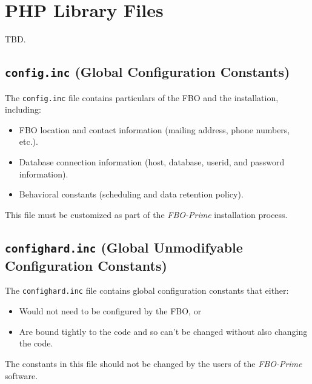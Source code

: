\documentclass[letterpaper,10pt,titlepage]{article}
\newcommand{\productbasename}{FBO-Prime}
\begin{document}
\section{PHP Library Files}
\label{sphl0}

TBD.


\subsection{\texttt{config.inc} (Global Configuration Constants)}
\label{sphl0:siph0}

The \texttt{config.inc} file contains particulars
of the FBO and the installation, including:

\begin{itemize}
\item FBO location and contact information (mailing address, phone numbers, etc.).
\item Database connection information (host, database, userid, and password information).
\item Behavioral constants (scheduling and data retention policy).
\end{itemize}

This file must be customized as part of the
\emph{\productbasename{}} installation process.


\subsection{\texttt{confighard.inc} (Global Unmodifyable Configuration Constants)}
\label{sphl0:scfh1}

The \texttt{confighard.inc} file contains
global configuration constants that either:

\begin{itemize}
\item Would not need to be configured by the FBO, or
\item Are bound tightly to the code and so can't be changed without also
      changing the code.
\end{itemize}

The constants in this file should not be changed by the users of the
\emph{\productbasename{}} software.
\end{document}
